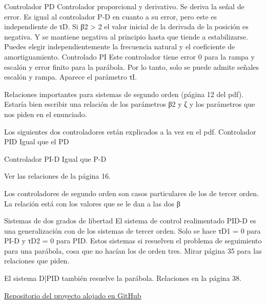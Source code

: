 \documentclass[a4paper]{article}
\begin{document}
Controlador PD
Controlador proporcional y derivativo. Se deriva la señal de error.
Es igual al controlador P-D en cuanto a su error, pero este es independiente de τD.
Si β2 > 2 el valor inicial de la derivada de la posición es negativa. Y se mantiene negativa al principio hasta que tiende a estabilizarse.
Puedes elegir independientemente la frecuencia natural y el coeficiente de amortiguamiento.
Controlado PI
Este controlador tiene error 0 para la rampa y escalón y error finito para la parábola.
Por lo tanto, solo se puede admite señales escalón y rampa.
Aparece el parámetro τI.

Relaciones importantes para sistemas de segundo orden (página 12 del pdf). Estaría bien escribir una relación de los parámetros β2 y  ζ y los parámetros que nos piden en el enunciado.

Los siguientes dos controladores están explicados a la vez en el pdf.
Controlador PID
Igual que el PD

Controlador PI-D
Igual que P-D

Ver las relaciones de la página 16.

Los controladores de segundo orden son casos particulares de los de tercer orden. La relación está con los valores que se le dan a las dos  β

Sistemas de dos grados de libertad
El sistema de control realimentado PID-D es una generalización con de los sistemas de tercer orden. Solo se hace  τD1 = 0 para PI-D y  τD2 = 0 para PID.
Estos sistemas si resuelven el problema de seguimiento para una parábola, cosa que no hacían los de orden tres.
Mirar página 35 para las relaciones que piden.

El sistema D|PID también resuelve la parábola.
Relaciones en la página 38.



\begin{thebibliography}{9}
 \href{https://github.com/avicarioe/telelabo}{Repositorio del proyecto alojado en GitHub}

\end{thebibliography}
\end{document}

